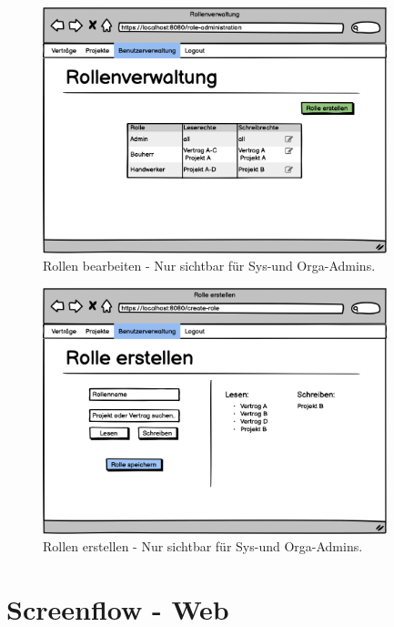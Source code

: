 \begin{figure}[h]
\centering
\includegraphics[width=10cm]{img/mockup_web/admin-roles.png}
\caption{Rollen bearbeiten - Nur sichtbar für Sys-und Orga-Admins.}
\end{figure}

\begin{figure}[h]
\centering
\includegraphics[width=10cm]{img/mockup_web/admin-create-role.png}
\caption{Rollen erstellen - Nur sichtbar für Sys-und Orga-Admins.}
\end{figure}

\clearpage

\section{Screenflow - Web}

